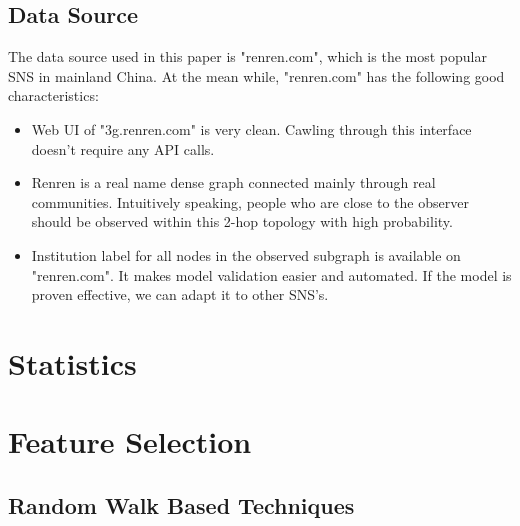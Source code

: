 \documentclass[11pt,a4paper]{article}
\begin{document}
\subsection{Data Source}

The data source used in this paper is "renren.com", which is the 
most popular SNS in mainland China. At the mean while, "renren.com" 
has the following good characteristics:
\begin{itemize}
	\item Web UI of "3g.renren.com" is very clean. Cawling through
	this interface doesn't require any API calls.  
	\item Renren is a real name dense graph connected mainly through 
	real communities. Intuitively speaking, 
	people who are close to the observer should be observed within 
	this 2-hop topology with high probability. 
	\item Institution label for all nodes in the observed subgraph
	is available on "renren.com". It makes model validation easier
	and automated. If the model is proven effective, we can adapt 
	it to other SNS's. 
\end{itemize}



\section{Statistics}

\section{Feature Selection}

\subsection{Random Walk Based Techniques}
\end{document}
